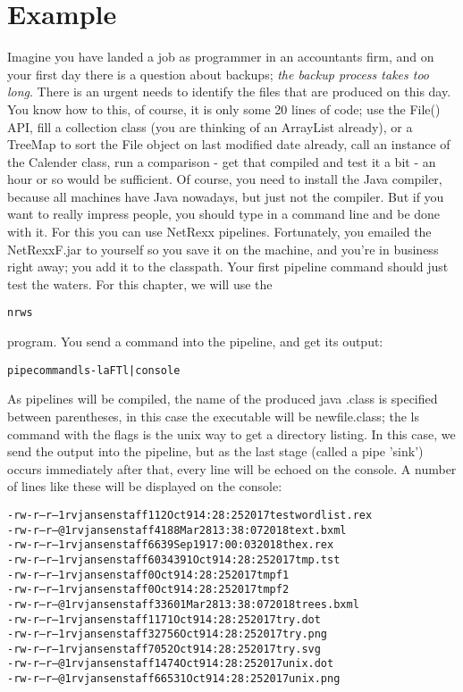 \chapter{Example}
Imagine you have landed a job as programmer in an accountants firm,
and on your first day there is a question about backups; \emph{the backup
process takes too long}. There is an urgent needs to identify the files that are produced on this day. You know how to this, of course, it is only some 20 lines of code; use the File() API, fill a collection class (you are thinking of an ArrayList already), or a TreeMap to sort the File object on last modified date already, call an instance of the Calender class, run a comparison - get that compiled and test it a bit - an hour or so would be sufficient. Of course, you need to install the Java compiler, because all machines have Java nowadays, but just not the compiler.
But if you want to really impress people, you should type in a command line and be done with it. For this you can use NetRexx pipelines. Fortunately, you emailed the NetRexxF.jar to yourself so you save it on the machine, and you're in business right away; you add it to the classpath.
Your first pipeline command should just test the waters. For this
chapter, we will use the \begin{alltt}nrws\end{alltt} program. You send a
command into the pipeline, and get its output:
\begin{alltt}
pipe command ls -laFTl | console
\end{alltt}
As pipelines will be compiled, the name of the produced java .class is specified between parentheses, in this case the executable will be newfile.class; the ls command with the flags is the unix way to get a directory listing. In this case, we send the output into the pipeline, but as the last stage (called a pipe 'sink') occurs immediately after that, every line will be echoed on the console.
A number of lines like these will be displayed on the console:
\begin{alltt}
-rw-r--r-- 1 rvjansen staff 112 Oct 9 14:28:25 2017 testwordlist.rex
-rw-r--r--@ 1 rvjansen staff 4188 Mar 28 13:38:07 2018 text.bxml
-rw-r--r-- 1 rvjansen staff 6639 Sep 19 17:00:03 2018 thex.rex
-rw-r--r-- 1 rvjansen staff 6034391 Oct 9 14:28:25 2017 tmp.tst
-rw-r--r-- 1 rvjansen staff 0 Oct 9 14:28:25 2017 tmpf1
-rw-r--r-- 1 rvjansen staff 0 Oct 9 14:28:25 2017 tmpf2
-rw-r--r--@ 1 rvjansen staff 33601 Mar 28 13:38:07 2018 trees.bxml
-rw-r--r-- 1 rvjansen staff 1171 Oct 9 14:28:25 2017 try.dot
-rw-r--r-- 1 rvjansen staff 32756 Oct 9 14:28:25 2017 try.png
-rw-r--r-- 1 rvjansen staff 7052 Oct 9 14:28:25 2017 try.svg
-rw-r--r--@ 1 rvjansen staff 1474 Oct 9 14:28:25 2017 unix.dot
-rw-r--r--@ 1 rvjansen staff 66531 Oct 9 14:28:25 2017 unix.png
\end{alltt}
